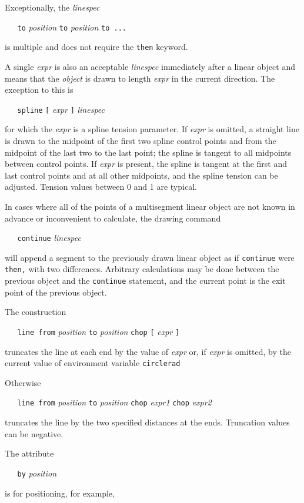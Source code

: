 Exceptionally, the
{\it linespec}

{\tt \ \ \ to}
{\it position}
{\tt to}
{\it position}
{\tt to\ ...}

is multiple and does not require the
{\tt then}
keyword.

A single
{\it expr}
is also an acceptable
{\it linespec}
immediately after a linear object and means that the
{\it object}
is drawn to length
{\it expr}
in the current direction.
The exception to this is

{\tt \ \ \ spline}
{\tt [}
{\it expr}
{\tt ]}
{\it linespec}

for which the
{\it expr}
is a spline tension parameter.
If
{\it expr}
is omitted, a straight line is drawn to the midpoint of the first two
spline control points and from the midpoint of the last two to the last
point; the spline is tangent to all midpoints between control points.
If
{\it expr}
is present, the spline is tangent at the first and last control points
and at all other midpoints, and the spline tension can be
adjusted.
Tension values between 0 and 1 are typical.

In cases where all of the points of a multisegment linear object are
not known in advance or inconvenient to calculate, the drawing command

{\tt \ \ \ continue}
{\it linespec}

will append a segment to the previously drawn linear object as if
{\tt continue}
were
{\tt then,}
with two differences.
Arbitrary calculations may be done between the previous object and the
{\tt continue}
statement, and the current point is the exit point of the previous object.

The construction

{\tt \ \ \ line\ from}
{\it position}
{\tt to}
{\it position}
{\tt chop}
{\tt [}
{\it expr}
{\tt ]}

truncates the line at each end by the value of
{\it expr}
or, if
{\it expr}
is omitted, by the current value of environment variable
{\tt circlerad}

Otherwise

{\tt \ \ \ line\ from}
{\it position}
{\tt to}
{\it position}
{\tt chop}
{\it expr1}
{\tt chop}
{\it expr2}

truncates the line by the two specified distances at the ends.
Truncation values can be negative.

The attribute

{\tt \ \ \ by}
{\it position}

is for positioning, for example,


